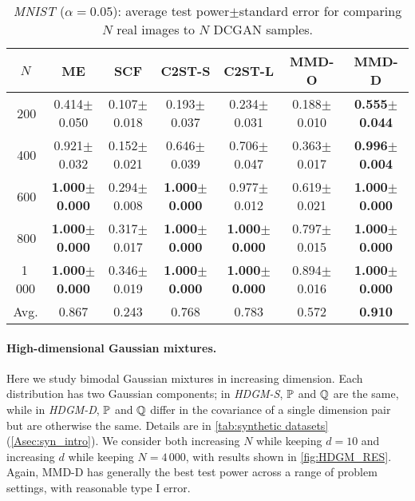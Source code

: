 \documentclass{article}
\newcommand{\mnstd}[2]{#1{\scriptsize$\pm$#2}}
\begin{document}
\begin{table*}[ht]
\centering
  \footnotesize
  \caption{\emph{MNIST} ($\alpha = 0.05$): average test power$\pm$standard error for comparing $N$ real images to $N$ DCGAN samples. } \label{tab:MNIST_RES1}
\vspace{1mm}
\begin{tabular}{c|cccccc}
\toprule
$N$ & ME & SCF & C2ST-S& C2ST-L & MMD-O & MMD-D \\
\midrule
\phantom{1}$\,$200 & \mnstd{0.414}{0.050} & \mnstd{0.107}{0.018} & \mnstd{0.193}{0.037} & \mnstd{0.234}{0.031} & \mnstd{0.188}{0.010} & \mnstd{\bf 0.555}{0.044}  \\
\phantom{1}$\,$400 & \mnstd{0.921}{0.032} & \mnstd{0.152}{0.021} & \mnstd{0.646}{0.039} & \mnstd{0.706}{0.047} & \mnstd{0.363}{0.017} & \mnstd{\bf 0.996}{0.004} \\
\phantom{1}$\,$600 & \mnstd{\bf 1.000}{0.000} & \mnstd{0.294}{0.008} & \mnstd{\bf 1.000}{0.000} & \mnstd{0.977}{0.012} & \mnstd{0.619}{0.021} & \mnstd{\bf 1.000}{0.000} \\
\phantom{1}$\,$800 & \mnstd{\bf 1.000}{0.000} & \mnstd{0.317}{0.017} & \mnstd{\bf 1.000}{0.000} & \mnstd{\bf 1.000}{0.000} & \mnstd{0.797}{0.015} & \mnstd{\bf 1.000}{0.000} \\
          1$\,$000 & \mnstd{\bf 1.000}{0.000} & \mnstd{0.346}{0.019} & \mnstd{\bf 1.000}{0.000} & \mnstd{\bf 1.000}{0.000} & \mnstd{0.894}{0.016} & \mnstd{\bf 1.000}{0.000} \\
\midrule
Avg. & 0.867 & 0.243 & 0.768 & 0.783 & 0.572 & {\bf 0.910} \\
\bottomrule
\end{tabular}
\vspace{-1em}
\end{table*}

\vspace{-1.5ex}\paragraph{High-dimensional Gaussian mixtures.}
Here we study bimodal Gaussian mixtures in increasing dimension.
Each distribution has two Gaussian components;
in \emph{HDGM-S}, $\P$ and $\Q$ are the same,
while in \emph{HDGM-D}, $\P$ and $\Q$ differ in the covariance of a single dimension pair but are otherwise the same.
Details are in \cref{tab:synthetic datasets} (\cref{Asec:syn_intro}).
We consider both increasing $N$ while keeping $d = 10$
and increasing $d$ while keeping $N = 4\,000$,
with results shown in \cref{fig:HDGM_RES}.
Again, MMD-D has generally the best test power across a range of problem settings,
with reasonable type I error.
\end{document}
